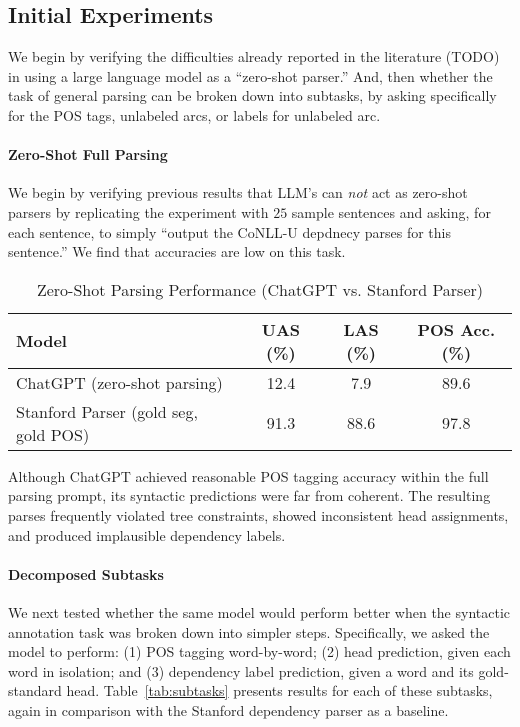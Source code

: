 \subsection{Initial Experiments}
\label{subsec:initial-experiments}

We begin by verifying the difficulties already reported in the literature (TODO) in using a large language model as a ``zero-shot parser.''
And, then whether the task of general parsing can be broken down into subtasks, by asking specifically for the POS tags, unlabeled arcs, or labels for unlabeled arc.

\paragraph{Zero-Shot Full Parsing}
We begin by verifying previous results that LLM's can {\em not} act as zero-shot parsers by replicating the experiment with $25$ sample sentences and asking, for each sentence, to simply ``output the CoNLL-U depdnecy parses for this sentence.'' We find that accuracies are low on this task.

\begin{table}[h]
\centering
\caption{Zero-Shot Parsing Performance (ChatGPT vs. Stanford Parser)}
\label{tab:zeroshot}
\begin{tabular}{lccc}
\toprule
\textbf{Model} & \textbf{UAS (\%)} & \textbf{LAS (\%)} & \textbf{POS Acc. (\%)} \\
\midrule
ChatGPT (zero-shot parsing) & 12.4 & 7.9 & 89.6 \\
Stanford Parser (gold seg, gold POS) & 91.3 & 88.6 & 97.8 \\
\bottomrule
\end{tabular}
\end{table}

Although ChatGPT achieved reasonable POS tagging accuracy within the full parsing prompt, its syntactic predictions were far from coherent. The resulting parses frequently violated tree constraints, showed inconsistent head assignments, and produced implausible dependency labels.

\paragraph{Decomposed Subtasks}
We next tested whether the same model would perform better when the syntactic annotation task was broken down into simpler steps. Specifically, we asked the model to perform: (1) POS tagging word-by-word; (2) head prediction, given each word in isolation; and (3) dependency label prediction, given a word and its gold-standard head. Table~\ref{tab:subtasks} presents results for each of these subtasks, again in comparison with the Stanford dependency parser as a baseline.

